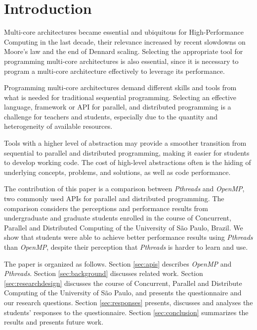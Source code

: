 \section{Introduction}
\label{sec:introduction}

Multi-core architectures became essential and ubiquitous for High-Performance
Computing in the last decade, their relevance increased by recent slowdowns on
Moore's law and the end of Dennard scaling.  Selecting the appropriate tool for
programming multi-core architectures is also essential, since it is necessary
to program a multi-core architecture effectively to leverage its performance.

Programming multi-core architectures demand different skills and tools from
what is needed for traditional sequential programming. Selecting an effective
language, framework or API for parallel, and distributed programming is a
challenge for teachers and students, especially due to the quantity and
heterogeneity of available resources.

Tools with a higher level of abstraction may provide a smoother transition from
sequential to parallel and distributed programming, making it easier for
students to develop working code. The cost of high-level abstractions often is
the hiding of underlying concepts, problems, and solutions, as well as code
performance.

The contribution of this paper is a comparison between \textit{Pthreads} and
\textit{OpenMP}, two commonly used APIs for parallel and distributed
programming.  The comparison considers the perceptions and performance results
from undergraduate and graduate students enrolled in the course of Concurrent,
Parallel and Distributed Computing of the University of São Paulo, Brazil.  We
show that students were able to achieve better performance results using
\textit{Pthreads} than \textit{OpenMP}, despite their perception that
\textit{Pthreads} is harder to learn and use.

The paper is organized as follows.
Section \ref{sec:apis} describes \textit{OpenMP} and \textit{Pthreads}.
Section \ref{sec:background} discusses related work.
Section \ref{sec:researchdesign} discusses the course of
Concurrent, Parallel and Distribute Computing of the University
of São Paulo, and presents the questionnaire and our research
questions.
Section \ref{sec:responses} presents, discusses and analyses
the students' responses to the questionnaire.
Section \ref{sec:conclusion} summarizes the results and
presents future work.
